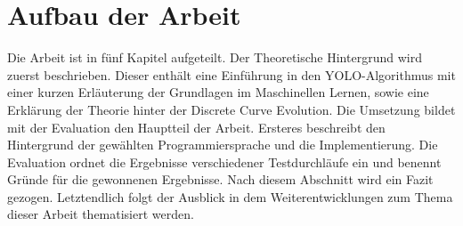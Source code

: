 \section{Aufbau der Arbeit}
{Die Arbeit ist in fünf Kapitel aufgeteilt. Der Theoretische Hintergrund wird zuerst beschrieben. Dieser enthält eine Einführung in den YOLO-Algorithmus mit einer kurzen Erläuterung der Grundlagen im Maschinellen Lernen, sowie eine Erklärung der Theorie hinter der Discrete Curve Evolution. Die Umsetzung bildet mit der Evaluation den Hauptteil der Arbeit. Ersteres beschreibt den Hintergrund der gewählten Programmiersprache und die Implementierung. Die Evaluation ordnet die Ergebnisse verschiedener Testdurchläufe ein und benennt Gründe für die gewonnenen Ergebnisse. Nach diesem Abschnitt wird ein Fazit gezogen. Letztendlich folgt der Ausblick in dem Weiterentwicklungen zum Thema dieser Arbeit thematisiert werden. }




